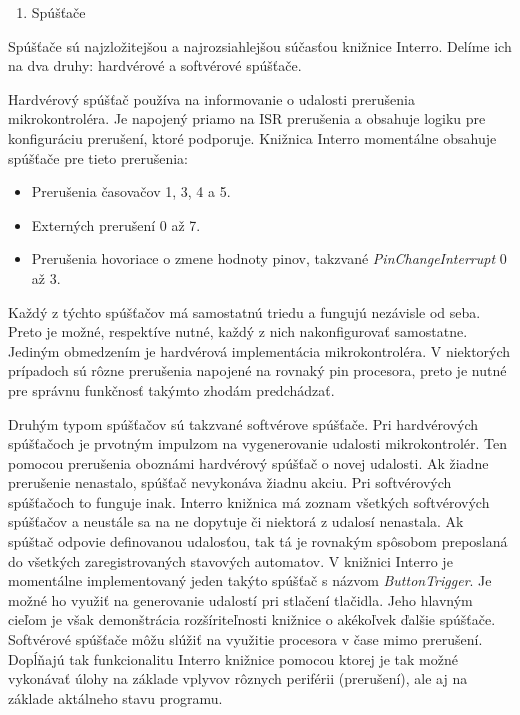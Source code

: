 \begin{enumerate}[resume]
    \item Spúšťače
\end{enumerate}
Spúšťače sú najzložitejšou a najrozsiahlejšou súčasťou knižnice Interro.
Delíme ich na dva druhy: hardvérové a softvérové spúšťače. \par
Hardvérový spúšťač používa na informovanie o udalosti prerušenia mikrokontroléra. Je napojený priamo na ISR prerušenia a obsahuje logiku pre konfiguráciu prerušení,
ktoré podporuje. Knižnica Interro momentálne obsahuje spúšťače pre tieto prerušenia:
\begin{itemize}
    \item Prerušenia časovačov 1, 3, 4 a 5.
    \item Externých prerušení 0 až 7.
    \item Prerušenia hovoriace o zmene hodnoty pinov, takzvané \textit{PinChangeInterrupt} 0 až 3.
\end{itemize}

Každý z týchto spúšťačov má samostatnú triedu a fungujú nezávisle od seba. Preto je možné, respektíve nutné, každý z nich
nakonfigurovať samostatne. Jediným obmedzením je hardvérová implementácia mikrokontroléra. V niektorých prípadoch sú rôzne prerušenia napojené na rovnaký pin procesora,
preto je nutné pre správnu funkčnosť takýmto zhodám predchádzať. \par

Druhým typom spúšťačov sú takzvané softvérove spúšťače. Pri hardvérových spúšťačoch je prvotným impulzom na vygenerovanie udalosti mikrokontrolér. Ten pomocou prerušenia
oboznámi hardvérový spúšťač o novej udalosti. Ak žiadne prerušenie nenastalo, spúšťač nevykonáva žiadnu akciu. Pri softvérových spúšťačoch to funguje inak. Interro knižnica
má zoznam všetkých softvérových spúšťačov a neustále sa na ne dopytuje či niektorá z udalosí nenastala. Ak spúštač odpovie definovanou udalosťou,
tak tá je rovnakým spôsobom preposlaná do všetkých zaregistrovaných stavových automatov. V knižnici Interro je momentálne implementovaný jeden takýto spúšťač s názvom
\textit{ButtonTrigger}. Je možné ho využiť na generovanie udalostí pri stlačení tlačidla. Jeho hlavným cieľom je však demonštrácia rozšíriteľnosti  knižnice o akékoľvek
ďalšie spúšťače. Softvérové spúšťače môžu slúžiť na využitie procesora v čase mimo prerušení. Dopĺňajú tak funkcionalitu Interro knižnice pomocou ktorej je tak
možné vykonávať úlohy na základe vplyvov rôznych periférii (prerušení), ale aj na základe aktálneho stavu programu. \par


